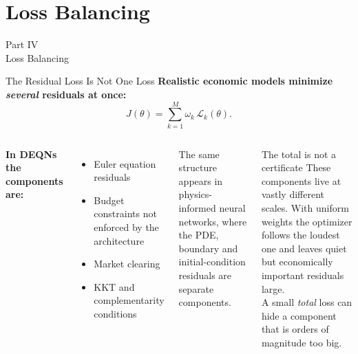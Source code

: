 \documentclass[aspectratio=169,11pt]{beamer}
\newcommand{\emphc}[1]{\textcolor{harvardcrimson}{#1}}
\newcommand{\param}{\theta}          %
\begin{document}

\section{Loss Balancing}

\begin{frame}{}
\begin{center}
{\Huge \textcolor{uzhblue}{Part IV}}\\[0.8em]
{\LARGE Loss Balancing}
\end{center}
\end{frame}

\begin{frame}{The Residual Loss Is Not One Loss}
\textbf{Realistic economic models minimize \emph{several} residuals at once:}
\[
  J(\param)=\sum_{k=1}^{M} \omega_k\,\mathcal{L}_k(\param).
\]

\vspace{0.2cm}
\begin{columns}[T]
\textbf{In DEQNs the components are:}
\begin{itemize}\itemsep1pt
    \item Euler equation residuals
    \item Budget constraints not enforced by the architecture
    \item Market clearing
    \item KKT and complementarity conditions
\end{itemize}

\vspace{0.25cm}
{\footnotesize The same structure appears in physics-informed neural networks, where the PDE, boundary and initial-condition residuals are separate components.}

\begin{alertblock}{The total is not a certificate}
These components live at \emphc{vastly different scales}. With uniform weights the optimizer follows the \emphc{loudest} one and leaves quiet but economically important residuals large.\\[3pt]
A small \emph{total} loss can hide a component that is orders of magnitude too big.
\end{alertblock}
\end{columns}
\end{frame}
\end{document}
